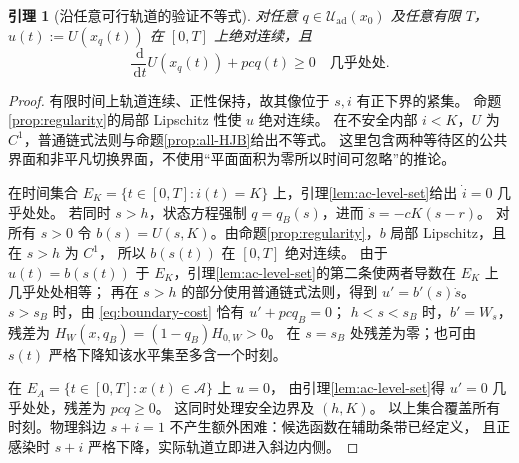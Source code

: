 \documentclass[11pt,a4paper,UTF8]{ctexart}
\newtheorem{lemma}[theorem]{引理}
\theoremstyle{definition}
\newcommand{\Acal}{\mathcal A}
\newcommand{\Uad}{\mathcal U_{\mathrm{ad}}}
\newcommand{\dd}{\,\mathrm d}
\begin{document}
\begin{lemma}[沿任意可行轨道的验证不等式]
\label{lem:trajectory-verification}
对任意 $q\in\Uad(x_0)$ 及任意有限 $T$，$u(t):=U(x_q(t))$ 在 $[0,T]$ 上绝对连续，且
\begin{equation}
\frac{\dd}{\dd t}U(x_q(t))+pcq(t)\ge0\quad\text{几乎处处}.
\label{eq:verification-ineq}
\end{equation}
\end{lemma}
\begin{proof}
有限时间上轨道连续、正性保持，故其像位于 $s,i$ 有正下界的紧集。
命题\ref{prop:regularity}的局部 Lipschitz 性使 $u$ 绝对连续。
在不安全内部 $i<K$，$U$ 为 $C^1$，普通链式法则与命题\ref{prop:all-HJB}给出不等式。
这里包含两种等待区的公共界面和非平凡切换界面，不使用“平面面积为零所以时间可忽略”的推论。

在时间集合 $E_K=\{t\in[0,T]:i(t)=K\}$ 上，引理\ref{lem:ac-level-set}给出 $\dot i=0$ 几乎处处。
若同时 $s>h$，状态方程强制 $q=q_B(s)$，进而 $\dot s=-cK(s-r)$。
对所有 $s>0$ 令 $b(s)=U(s,K)$。由命题\ref{prop:regularity}，$b$ 局部 Lipschitz，且在 $s>h$ 为 $C^1$，
所以 $b(s(t))$ 在 $[0,T]$ 绝对连续。
由于 $u(t)=b(s(t))$ 于 $E_K$，引理\ref{lem:ac-level-set}的第二条使两者导数在 $E_K$ 上几乎处处相等；
再在 $s>h$ 的部分使用普通链式法则，得到 $u'=b'(s)\dot s$。
$s>s_B$ 时，由 \eqref{eq:boundary-cost} 恰有 $u'+pcq_B=0$；
$h<s<s_B$ 时，$b'=W_s$，残差为 $H_W(x,q_B)=(1-q_B)H_{0,W}>0$。
在 $s=s_B$ 处残差为零；也可由 $s(t)$ 严格下降知该水平集至多含一个时刻。

在 $E_A=\{t\in[0,T]:x(t)\in\Acal\}$ 上 $u=0$，
由引理\ref{lem:ac-level-set}得 $u'=0$ 几乎处处，残差为 $pcq\ge0$。
这同时处理安全边界及 $(h,K)$。
以上集合覆盖所有时刻。物理斜边 $s+i=1$ 不产生额外困难：候选函数在辅助条带已经定义，
且正感染时 $s+i$ 严格下降，实际轨道立即进入斜边内侧。
\end{proof}
\end{document}
